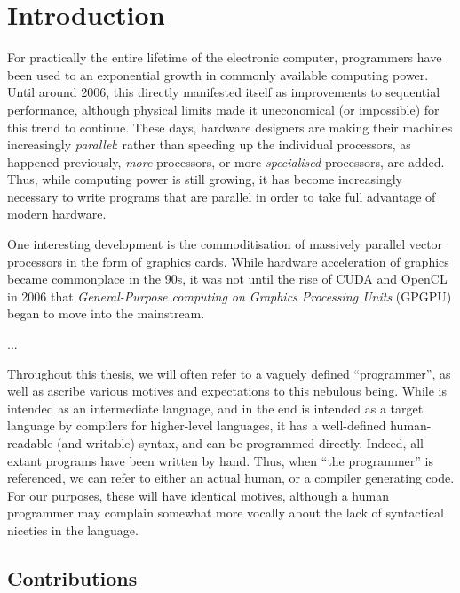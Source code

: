 \chapter{Introduction}

For practically the entire lifetime of the electronic computer,
programmers have been used to an exponential growth in commonly
available computing power.  Until around 2006, this directly
manifested itself as improvements to sequential performance, although
physical limits made it uneconomical (or impossible) for this trend to
continue.  These days, hardware designers are making their machines
increasingly \textit{parallel}: rather than speeding up the individual
processors, as happened previously, \textit{more} processors, or more
\textit{specialised} processors, are added.  Thus, while computing
power is still growing, it has become increasingly necessary to write
programs that are parallel in order to take full advantage of modern
hardware.

One interesting development is the commoditisation of massively
parallel vector processors in the form of graphics cards.  While
hardware acceleration of graphics became commonplace in the 90s, it
was not until the rise of CUDA and OpenCL in 2006 that
\textit{General-Purpose computing on Graphics Processing Units}
(GPGPU) began to move into the mainstream.

... 

Throughout this thesis, we will often refer to a vaguely defined
``programmer'', as well as ascribe various motives and expectations to
this nebulous being.  While \LO{} is intended as an intermediate
language, and in the end is intended as a target language by compilers
for higher-level languages, it has a well-defined human-readable (and
writable) syntax, and can be programmed directly.  Indeed, all extant
\LO{} programs have been written by hand.  Thus, when ``the
programmer'' is referenced, we can refer to either an actual human, or
a compiler generating \LO{} code.  For our purposes, these will have
identical motives, although a human programmer may complain somewhat
more vocally about the lack of syntactical niceties in the language.

\section{Contributions}


